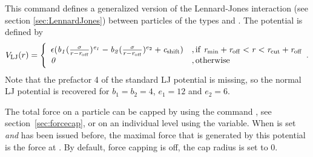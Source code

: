 This command defines a generalized version of the Lennard-Jones
interaction (see section \ref{sec:LennardJones}) between particles of
the types  and .  The potential is defined by
\begin{equation}
  \label{eq:lj-generic}
  V_\mathrm{LJ}(r) = \Biggl\{
    \begin{array}{ll}
      \epsilon(\mathrm{\mathit{b_1}}(\frac{\mathrm{\mathit{\sigma}}}{r-\mathrm{\mathit{r_\mathrm{off}}}})^{\mathrm{\mathit{e_1}}}
      -\mathrm{\mathit{b_2}}(\frac{\mathrm{\mathit{\sigma}}}{r-\mathrm{\mathit{r_\mathrm{off}}}})^{e_2}+\mathrm{\mathit{c_\mathrm{shift}}}) 
      & \mathrm{, if~} \mathrm{\mathit{r_\mathrm{min}}}+\mathrm{\mathit{r_\mathrm{off}}} < \mathrm{\mathit{r}} < \mathrm{\mathit{r_\mathrm{cut}}}+\mathrm{\mathit{r_\mathrm{off}}}\\
      \mathit{0} 
      & \mathrm{, otherwise}\\
    \end{array}.
\end{equation}
Note that the prefactor 4 of the standard LJ potential is missing, so the normal
LJ potential is recovered for $b_1=b_2=4$, $e_1=12$ and $e_2=6$.

The total force on a particle can be capped by using the command
, see section~\ref{sec:forcecap}, or on an
individual level using the  variable. When
 is set \emph{and}  has been issued before, the maximal force that is generated by
this potential is the force at .  By default,
force capping is off, \ie the cap radius is set to 0.

